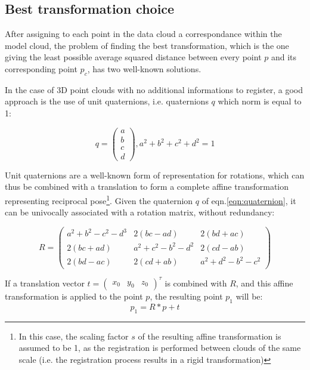 \subsection{Best transformation choice} \label{sec:icp-best-transformation}
After assigning to each point in the data cloud a correspondance within the
model cloud, the problem of finding the best transformation, which is the one
giving the least possible average squared distance between every point $p$ and
its corresponding point $p_c$, has two well-known solutions. 

In the case of 3D point clouds with no additional informations to register, a
good approach is the use of unit quaternions, i.e. quaternions $q$ which norm is
equal to 1:

\begin{equation} \label{eqn:quaternion}
q = \begin{pmatrix}a\\b\\c\\d\end{pmatrix}, a^2+b^2+c^2+d^2=1
\end{equation}

Unit quaternions are a well-known form of representation for rotations, which can
thus be combined with a translation to form a complete affine transformation
representing reciprocal pose\footnote{In this case, the scaling factor $s$ of
  the resulting affine transformation is assumed to be 1, as the registration is
  performed between clouds of the same scale (i.e. the registration process
results in a rigid transformation)}. Given the quaternion $q$ of
eqn.\ref{eqn:quaternion}, it can be univocally associated with a rotation
matrix, without redundancy:

\begin{equation} 
  R = \begin{pmatrix}
    a^2+b^2-c^2-d^3 & 2\left(b c - a d \right) & 2\left( b d + a c \right) \\
    2\left(b c + a d \right) & a^2+c^2-b^2-d^2 & 2\left( c d - a b \right) \\
    2\left( b d - a c \right) & 2\left(c d + a b\right) & a^2+d^2-b^2-c^2
  \end{pmatrix}
\end{equation}

If a translation vector $t=\begin{pmatrix}x_0 & y_0 & z_0\end{pmatrix}^{\tau}$
is combined with $R$, and this affine transformation is applied to the point
$p$, the resulting point $p_1$ will be:
\begin{equation}
  p_1=R*p+t
\end{equation}

